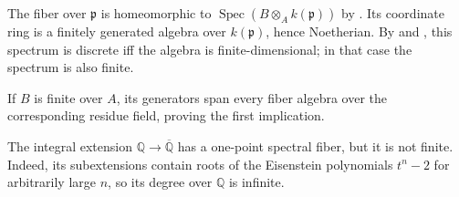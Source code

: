 The fiber over $\mathfrak p$ is homeomorphic to $\operatorname{Spec}(B\otimes_Ak(\mathfrak p))$ by . Its coordinate ring is a finitely generated algebra over $k(\mathfrak p)$, hence Noetherian. By  and , this spectrum is discrete iff the algebra is finite-dimensional; in that case the spectrum is also finite.

If $B$ is finite over $A$, its generators span every fiber algebra over the corresponding residue field, proving the first implication.

The integral extension $\mathbb Q\to\overline{\mathbb Q}$ has a one-point spectral fiber, but it is not finite. Indeed, its subextensions contain roots of the Eisenstein polynomials $t^n-2$ for arbitrarily large $n$, so its degree over $\mathbb Q$ is infinite.
